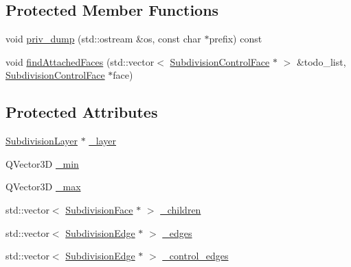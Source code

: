 \subsection*{Protected Member Functions}
\begin{DoxyCompactItemize}
\item 
void \hyperlink{classShipCAD_1_1SubdivisionControlFace_a224ce57a8d9d631eef63cccd8e0113f9}{priv\-\_\-dump} (std\-::ostream \&os, const char $\ast$prefix) const 
\item 
void \hyperlink{classShipCAD_1_1SubdivisionControlFace_aa6035e53cd1e32a9bd9e9f9800c9f7d4}{find\-Attached\-Faces} (std\-::vector$<$ \hyperlink{classShipCAD_1_1SubdivisionControlFace}{Subdivision\-Control\-Face} $\ast$ $>$ \&todo\-\_\-list, \hyperlink{classShipCAD_1_1SubdivisionControlFace}{Subdivision\-Control\-Face} $\ast$face)
\end{DoxyCompactItemize}
\subsection*{Protected Attributes}
\begin{DoxyCompactItemize}
\item 
\hyperlink{classShipCAD_1_1SubdivisionLayer}{Subdivision\-Layer} $\ast$ \hyperlink{classShipCAD_1_1SubdivisionControlFace_aee1990d4db7127ba59117a65c1a6ce7e}{\-\_\-layer}
\item 
Q\-Vector3\-D \hyperlink{classShipCAD_1_1SubdivisionControlFace_aac4f577da0f5203059901c5e09814e1d}{\-\_\-min}
\item 
Q\-Vector3\-D \hyperlink{classShipCAD_1_1SubdivisionControlFace_a22411574593283209772872bc740535b}{\-\_\-max}
\item 
std\-::vector$<$ \hyperlink{classShipCAD_1_1SubdivisionFace}{Subdivision\-Face} $\ast$ $>$ \hyperlink{classShipCAD_1_1SubdivisionControlFace_a116749a1de58ad46f68ad7e92031e673}{\-\_\-children}
\item 
std\-::vector$<$ \hyperlink{classShipCAD_1_1SubdivisionEdge}{Subdivision\-Edge} $\ast$ $>$ \hyperlink{classShipCAD_1_1SubdivisionControlFace_a390f626d9999ab3ce48878b223ea1693}{\-\_\-edges}
\item 
std\-::vector$<$ \hyperlink{classShipCAD_1_1SubdivisionEdge}{Subdivision\-Edge} $\ast$ $>$ \hyperlink{classShipCAD_1_1SubdivisionControlFace_a33d7e2ecd5f42edf5492efb83df3856b}{\-\_\-control\-\_\-edges}
\end{DoxyCompactItemize}

